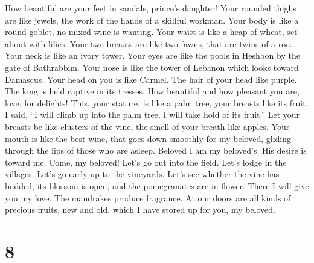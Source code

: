  How beautiful are your feet in sandals, prince's
daughter! Your rounded thighs are like jewels, the work of the hands of
a skillful workman.  Your body is like a round goblet, no
mixed wine is wanting. Your waist is like a heap of wheat, set about
with lilies.  Your two breasts are like two fawns, that
are twins of a roe.  Your neck is like an ivory tower.
Your eyes are like the pools in Heshbon by the gate of Bathrabbim. Your
nose is like the tower of Lebanon which looks toward Damascus.
 Your head on you is like Carmel. The hair of your head
like purple. The king is held captive in its tresses.  How
beautiful and how pleasant you are, love, for delights! 
This, your stature, is like a palm tree, your breasts like its fruit.
 I said, ``I will climb up into the palm tree. I will take
hold of its fruit.'' Let your breasts be like clusters of the vine, the
smell of your breath like apples.  Your mouth is like the
best wine, that goes down smoothly for my beloved, gliding through the
lips of those who are asleep. Beloved  I am my beloved's.
His desire is toward me.  Come, my beloved! Let's go out
into the field. Let's lodge in the villages.  Let's go
early up to the vineyards. Let's see whether the vine has budded, its
blossom is open, and the pomegranates are in flower. There I will give
you my love.  The mandrakes produce fragrance. At our
doors are all kinds of precious fruits, new and old, which I have stored
up for you, my beloved.

\hypertarget{section-7}{%
\section{8}\label{section-7}}

